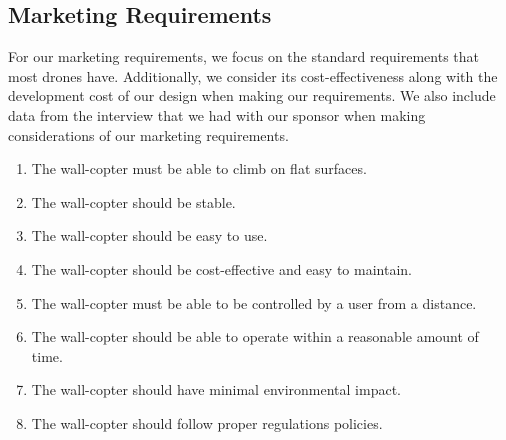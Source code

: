 \documentclass[12pt]{article}
\begin{document}
        \subsection{Marketing Requirements}
            For our marketing requirements, we focus on the standard requirements that most drones have.
            Additionally, we consider its cost-effectiveness along with the development cost of our design when making our requirements.
            We also include data from the interview that we had with our sponsor when making considerations of our marketing requirements.
            \begin{enumerate}[label=\arabic*.]
                \item The wall-copter must be able to climb on flat surfaces.
                \item The wall-copter should be stable.
                \item The wall-copter should be easy to use.
                \item The wall-copter should be cost-effective and easy to maintain.
                \item The wall-copter must be able to be controlled by a user from a distance.
                \item The wall-copter should be able to operate within a reasonable amount of time.
                \item The wall-copter should have minimal environmental impact.
                \item The wall-copter should follow proper regulations policies.
            \end{enumerate}
        
\end{document}
